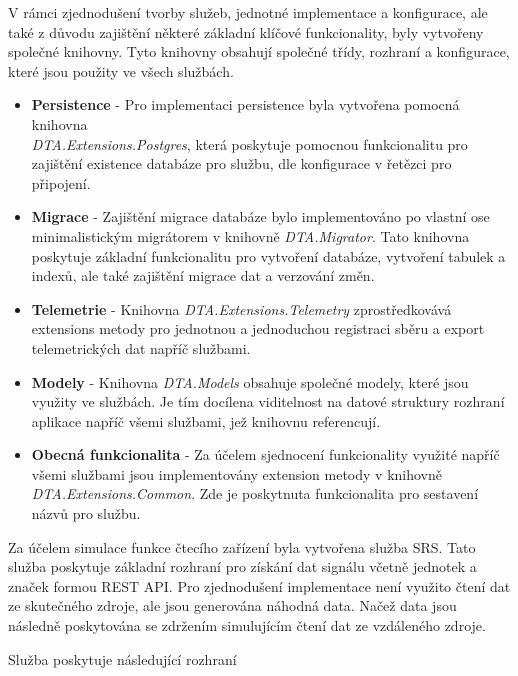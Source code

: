 
V rámci zjednodušení tvorby služeb, jednotné implementace a konfigurace, ale také z důvodu zajištění některé základní klíčové funkcionality, byly vytvořeny společné knihovny. Tyto knihovny obsahují společné třídy, rozhraní a konfigurace, které jsou použity ve všech službách.

\begin{itemize}
  \item \textbf{Persistence} - Pro implementaci persistence byla vytvořena pomocná knihovna \\ \emph{DTA.Extensions.Postgres}, která poskytuje pomocnou funkcionalitu pro zajištění existence databáze pro službu, dle konfigurace v řetězci pro připojení.
  \item \textbf{Migrace} - Zajištění migrace databáze bylo implementováno po vlastní ose minimalistickým migrátorem v knihovně \emph{DTA.Migrator}. Tato knihovna poskytuje základní funkcionalitu pro vytvoření databáze, vytvoření tabulek a indexů, ale také zajištění migrace dat a verzování změn.
  \item \textbf{Telemetrie} - Knihovna \emph{DTA.Extensions.Telemetry} zprostředkovává extensions metody pro jednotnou a jednoduchou registraci sběru a export telemetrických dat napříč službami.
  \item \textbf{Modely} - Knihovna \emph{DTA.Models} obsahuje společné modely, které jsou využity ve službách. Je tím docílena viditelnost na datové struktury rozhraní aplikace napříč všemi službami, jež knihovnu referencují.
  \item \textbf{Obecná funkcionalita} - Za účelem sjednocení funkcionality využité napříč všemi službami jsou implementovány extension metody v knihovně \\ \emph{DTA.Extensions.Common}. Zde je poskytnuta funkcionalita pro sestavení názvů pro službu.
\end{itemize}


Za účelem simulace funkce čtecího zařízení byla vytvořena služba SRS. Tato služba poskytuje základní rozhraní pro získání dat signálu včetně jednotek a značek formou REST API. Pro zjednodušení implementace není využito čtení dat ze skutečného zdroje, ale jsou generována náhodná data. Načež data jsou následně poskytována se zdržením simulujícím čtení dat ze vzdáleného zdroje.

Služba poskytuje následující rozhraní

